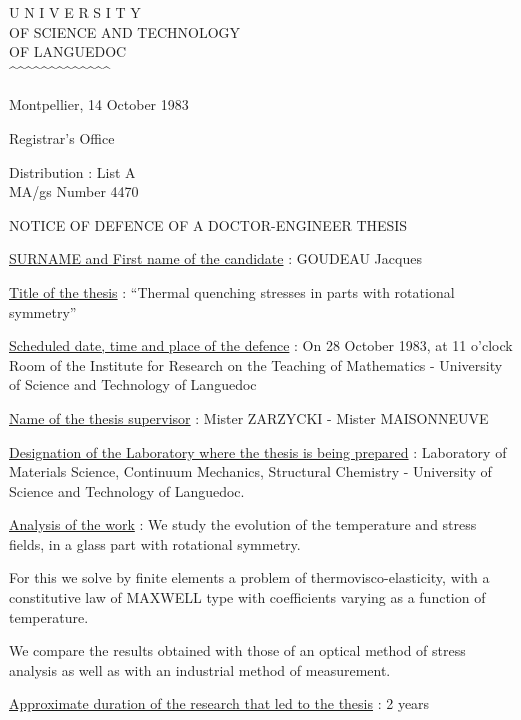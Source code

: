 
\begin{center}
U N I V E R S I T Y\\
OF SCIENCE AND TECHNOLOGY\\
OF LANGUEDOC\\
\textasciicircum\textasciicircum\textasciicircum\textasciicircum\textasciicircum\textasciicircum\textasciicircum\textasciicircum\textasciicircum\textasciicircum\textasciicircum\textasciicircum\textasciicircum
\end{center}

Montpellier, 14 October 1983

Registrar's Office

Distribution : List A\\
MA/gs \hfill Number 4470

\begin{center}
NOTICE OF DEFENCE OF A DOCTOR-ENGINEER THESIS

\end{center}

\uline{SURNAME and First name of the candidate} : GOUDEAU Jacques

\uline{Title of the thesis} : ``Thermal quenching stresses in parts with rotational symmetry''

\uline{Scheduled date, time and place of the defence} : On 28 October 1983, at 11 o'clock\\
Room of the Institute for Research on the Teaching of Mathematics - University of Science and Technology of Languedoc

\uline{Name of the thesis supervisor} : Mister ZARZYCKI - Mister MAISONNEUVE

\uline{Designation of the Laboratory where the thesis is being prepared} : Laboratory of Materials Science, Continuum Mechanics, Structural Chemistry - University of Science and Technology of Languedoc.

\uline{Analysis of the work} : We study the evolution of the temperature and stress fields, in a glass part with rotational symmetry.

For this we solve by finite elements a problem of thermovisco-elasticity, with a constitutive law of MAXWELL type with coefficients varying as a function of temperature.

We compare the results obtained with those of an optical method of stress analysis as well as with an industrial method of measurement.

\uline{Approximate duration of the research that led to the thesis} : 2 years

